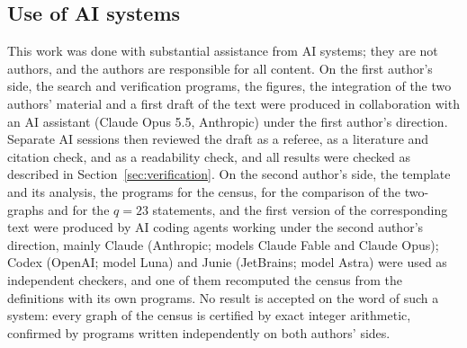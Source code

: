 \documentclass[11pt]{amsart}
\theoremstyle{definition}
\theoremstyle{remark}
\begin{document}
\subsection*{Use of AI systems}
This work was done with substantial assistance from AI systems; they are not authors, and the authors are responsible
for all content. On the first author's side, the search and verification programs, the figures, the integration of
the two authors' material and a first draft of the text were produced in collaboration with an AI assistant (Claude
Opus 5.5, Anthropic) under the first author's direction. Separate AI sessions then reviewed the draft as a referee, as
a literature and citation check, and as a readability check, and all results were checked as described in
Section~\ref{sec:verification}. On the second author's side, the template and its analysis, the programs for the
census, for the comparison of the two-graphs and for the $q=23$ statements, and the first version of the corresponding
text were produced by AI coding agents working under the second author's direction, mainly Claude (Anthropic; models
Claude Fable and Claude Opus); Codex (OpenAI; model Luna) and Junie (JetBrains; model Astra) were used as independent
checkers, and one of them recomputed the census from the definitions with its own programs. No result is accepted on
the word of such a system: every graph of the census is certified by exact integer arithmetic, confirmed by programs
written independently on both authors' sides.
\end{document}
